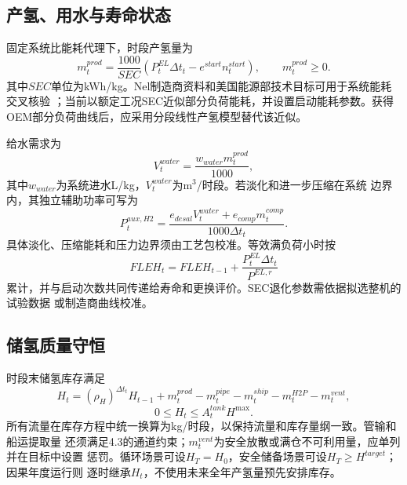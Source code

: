 \subsection{产氢、用水与寿命状态}

固定系统比能耗代理下，时段产氢量为
\begin{equation}
m_t^{prod}=\frac{1000}{SEC}
\left(P_t^{EL}\Delta t_t-e^{start}n_t^{start}\right),
\qquad m_t^{prod}\ge0.
\label{eq:h2-production}
\end{equation}
其中$SEC$单位为kWh/kg。Nel制造商资料和美国能源部技术目标可用于系统能耗交叉核验
\cite{nel-mc,doe-pem}；当前以额定工况SEC近似部分负荷能耗，并设置启动能耗参数。获得OEM部分负荷曲线后，应采用分段线性产氢模型替代该近似。

给水需求为
\begin{equation}
V_t^{water}=\frac{w_{water}m_t^{prod}}{1000},
\label{eq:h2-water}
\end{equation}
其中$w_{water}$为系统进水L/kg，$V_t^{water}$为m$^3$/时段。若淡化和进一步压缩在系统
边界内，其独立辅助功率可写为
\begin{equation}
P_t^{aux,H2}=
\frac{e_{desal}V_t^{water}+e_{comp}m_t^{comp}}
{1000\Delta t_t}.
\label{eq:h2-aux}
\end{equation}
具体淡化、压缩能耗和压力边界须由工艺包校准。等效满负荷小时按
\begin{equation}
FLEH_t=FLEH_{t-1}+\frac{P_t^{EL}\Delta t_t}{P^{EL,r}}
\label{eq:h2-fleh}
\end{equation}
累计，并与启动次数共同传递给寿命和更换评价。SEC退化参数需依据拟选整机的试验数据
或制造商曲线校准。

\subsection{储氢质量守恒}

时段末储氢库存满足
\begin{equation}
H_t=(\rho_H)^{\Delta t_t}H_{t-1}+m_t^{prod}
-m_t^{pipe}-m_t^{ship}-m_t^{H2P}-m_t^{vent},
\label{eq:h2-inventory}
\end{equation}
\begin{equation}
0\le H_t\le A_t^{tank}H^{\max}.
\label{eq:h2-capacity}
\end{equation}
所有流量在库存方程中统一换算为kg/时段，以保持流量和库存量纲一致。管输和船运提取量
还须满足4.3的通道约束；$m_t^{vent}$为安全放散或满仓不可利用量，应单列并在目标中设置
惩罚。循环场景可设$H_T=H_0$，安全储备场景可设$H_T\ge H^{target}$；因果年度运行则
逐时继承$H_t$，不使用未来全年产氢量预先安排库存。

